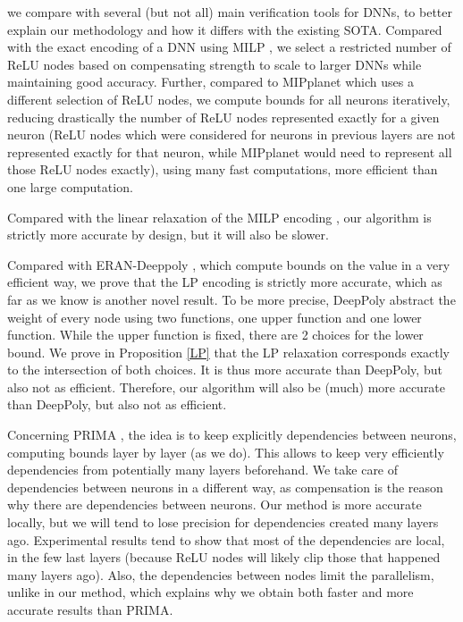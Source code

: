  we compare with several (but not all) main verification tools for DNNs, to better explain our methodology and how it differs with the existing SOTA. Compared with the exact encoding of a DNN using MILP \cite{MILP}, 
we select a restricted number of ReLU nodes based on compensating strength to scale to larger DNNs while maintaining good accuracy. Further, compared to MIPplanet \cite{MIPplanet} which 
uses a different selection of ReLU nodes, we compute bounds for all neurons iteratively, reducing drastically the number of ReLU nodes represented exactly for a given neuron (ReLU nodes which were considered for neurons in previous layers are not represented exactly for that neuron, while MIPplanet would need to represent all those ReLU nodes exactly), using many fast computations, more efficient than one large computation.

Compared with the linear relaxation of the MILP encoding \cite{MILP}, our algorithm is strictly more accurate by design, but it will also be slower.

Compared with ERAN-Deeppoly \cite{deeppoly}, which compute bounds on the value in a very efficient way, we prove that the LP encoding is strictly more accurate, which as far as we know is another novel result. To be more precise, DeepPoly
abstract the weight of every node using two functions, one upper function and one lower function. While the upper function is fixed, there are 2 choices for the lower bound.
We prove in Proposition  \ref{LP} that the LP relaxation corresponds exactly to the intersection of both choices. It is thus more accurate than DeepPoly, but also not as efficient. Therefore, our algorithm will also be (much) more accurate than DeepPoly, but also not as efficient.

Concerning PRIMA \cite{prima}, the idea is to keep explicitly dependencies between neurons, computing bounds layer by layer (as we do). This allows to keep very efficiently dependencies from potentially many layers beforehand. We take care of dependencies between neurons in a different way, as compensation is the reason why there are dependencies between neurons. 
Our method is more accurate locally, but we will tend to lose precision for dependencies created many layers ago. Experimental results tend to show that most of the dependencies are local, in the few last layers (because ReLU nodes will likely clip those that happened many layers ago). Also, the dependencies between nodes limit the parallelism, unlike in our method, which explains why we obtain both faster and more accurate results than PRIMA.

